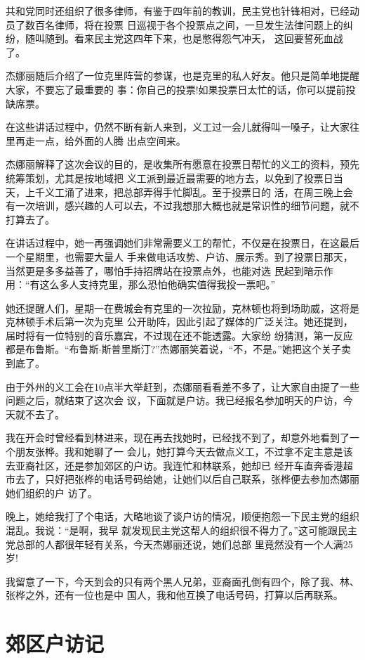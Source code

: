 ﻿\documentclass[11pt]{article}
\begin{document}
共和党同时还组织了很多律师，有鉴于四年前的教训，民主党也针锋相对，已经动员了数百名律师，将在投票
日巡视于各个投票点之间，一旦发生法律问题上的纠纷，随叫随到。看来民主党这四年下来，也是憋得怨气冲天，
这回要誓死血战了。

杰娜丽随后介绍了一位克里阵营的参谋，也是克里的私人好友。他只是简单地提醒大家，不要忘了最重要的
事：你自己的投票!如果投票日太忙的话，你可以提前投缺席票。

在这些讲话过程中，仍然不断有新人来到，义工过一会儿就得叫一嗓子，让大家往里再走一点，给外面的人腾
出点空间来。

杰娜丽解释了这次会议的目的，是收集所有愿意在投票日帮忙的义工的资料，预先统筹策划，尤其是按地域把
义工派到最近最需要的地方去，以免到了投票日当天，上千义工涌了进来，把总部弄得手忙脚乱。至于投票日的
活，在周三晚上会有一次培训，感兴趣的人可以去，不过我想那大概也就是常识性的细节问题，就不打算去了。


在讲话过程中，她一再强调她们非常需要义工的帮忙，不仅是在投票日，在这最后一个星期里，也需要大量人
手来做电话攻势、户访、展示秀。到了投票日那天，当然更是多多益善了，哪怕手持招牌站在投票点外，也能对选
民起到暗示作用：``有这么多人支持克里，那么恐怕他确实值得我投一票吧。''

她还提醒人们，星期一在费城会有克里的一次拉励，克林顿也将到场助威，这将是克林顿手术后第一次为克里
公开助阵，因此引起了媒体的广泛关注。她还提到，届时将有一位特别的音乐嘉宾，不过现在还不能透露。大家纷
纷猜测，第一反应都是布鲁斯。``布鲁斯$\cdot$斯普里斯汀?''杰娜丽笑着说，``不，不是。''她把这个关子卖
到底了。

由于外州的义工会在10点半大举赶到，杰娜丽看看差不多了，让大家自由提了一些问题之后，就结束了这次会
议，下面就是户访。我已经报名参加明天的户访，今天就不去了。

我在开会时曾经看到林进来，现在再去找她时，已经找不到了，却意外地看到了一个朋友张桦。我和她聊了一
会儿，她打算今天去做点义工，不过拿不定主意是该去亚裔社区，还是参加郊区的户访。我连忙和林联系，她却已
经开车直奔香港超市去了，只好把张桦的电话号码给她，让她们以后自己联系，张桦便去参加杰娜丽她们组织的户
访了。

晚上，她给我打了个电话，大略地谈了谈户访的情况，顺便抱怨一下民主党的组织混乱。我说：``是啊，我早
就发现民主党这帮人的组织很不得力了。''这可能跟民主党总部的人都很年轻有关系，今天杰娜丽还说，她们总部
里竟然没有一个人满25岁!

我留意了一下，今天到会的只有两个黑人兄弟，亚裔面孔倒有四个，除了我、林、张桦之外，还有一位也是中
国人，我和他互换了电话号码，打算以后再联系。

\section{郊区户访记}
\end{document}
